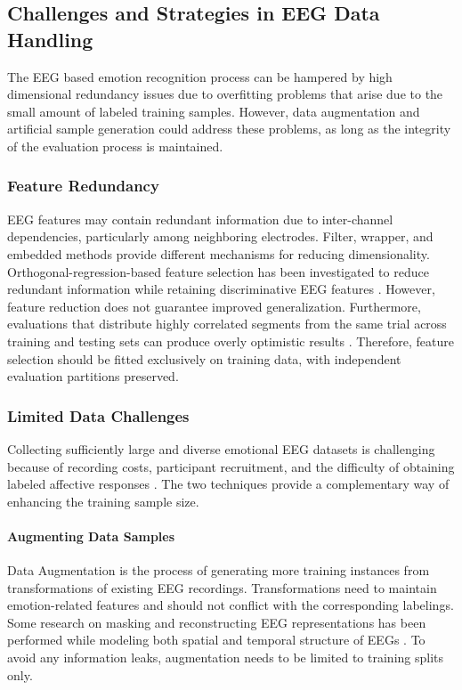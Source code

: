 \documentclass[ASNA,twocolumn]{USG}
\begin{document}
\subsection{Challenges and Strategies in EEG Data Handling}

The EEG based emotion recognition process can be hampered by high dimensional redundancy issues due to overfitting problems that arise due to the small amount of labeled training samples. However, data augmentation and artificial sample generation could address these problems, as long as the integrity of the evaluation process is maintained.

\subsubsection{Feature Redundancy}

EEG features may contain redundant information due to inter-channel dependencies, particularly among neighboring electrodes. Filter, wrapper, and embedded methods provide different mechanisms for reducing dimensionality. Orthogonal-regression-based feature selection has been investigated to reduce redundant information while retaining discriminative EEG features \cite{xu2020eeg}. However, feature reduction does not guarantee improved generalization. Furthermore, evaluations that distribute highly correlated segments from the same trial across training and testing sets can produce overly optimistic results \cite{lew2020eeg}. Therefore, feature selection should be fitted exclusively on training data, with independent evaluation partitions preserved.

\subsubsection{Limited Data Challenges}

Collecting sufficiently large and diverse emotional EEG datasets is challenging because of recording costs, participant recruitment, and the difficulty of obtaining labeled affective responses \cite{luo2018_cwgan}. The two techniques provide a complementary way of enhancing the training sample size.

\paragraph{Augmenting Data Samples}

Data Augmentation is the process of generating more training instances from transformations of existing EEG recordings. Transformations need to maintain emotion-related features and should not conflict with the corresponding labelings. Some research on masking and reconstructing EEG representations has been performed while modeling both spatial and temporal structure of EEGs \cite{zhang2022ganser}. To avoid any information leaks, augmentation needs to be limited to training splits only.
\end{document}
